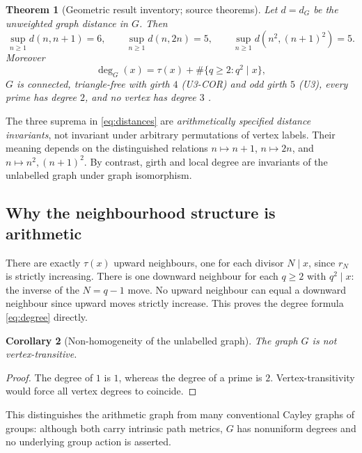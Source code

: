 \documentclass[11pt,a4paper]{article}
\newtheorem{theorem}{Theorem}[section]
\newtheorem{corollary}[theorem]{Corollary}
\theoremstyle{definition}\newtheorem{definition}[theorem]{Definition}
\begin{document}
\begin{theorem}[Geometric result inventory; source theorems]\label{thm:geom}
Let $d=d_G$ be the unweighted graph distance in $G$. Then
\begin{equation}\label{eq:distances}
\sup_{n\ge1}d(n,n+1)=6,\qquad
\sup_{n\ge1}d(n,2n)=5,\qquad
\sup_{n\ge1}d(n^2,(n+1)^2)=5.
\end{equation}
Moreover
\begin{equation}\label{eq:degree}
\deg_G(x)=\tau(x)+\#\{q\ge2:q^2\mid x\},
\end{equation}
$G$ is connected, triangle-free with girth $4$ (U3-COR) and odd girth $5$ (U3), every prime has degree $2$, and no vertex has degree $3$ \cite{geometry,u3,u3cor}.
\end{theorem}

The three suprema in \eqref{eq:distances} are \emph{arithmetically specified distance invariants}, not invariant under arbitrary permutations of vertex labels. Their meaning depends on the distinguished relations $n\mapsto n+1$, $n\mapsto 2n$, and $n\mapsto n^2,(n+1)^2$. By contrast, girth and local degree are invariants of the unlabelled graph under graph isomorphism.

\subsection{Why the neighbourhood structure is arithmetic}
There are exactly $\tau(x)$ upward neighbours, one for each divisor $N\mid x$, since $r_N$ is strictly increasing. There is one downward neighbour for each $q\ge2$ with $q^2\mid x$: the inverse of the $N=q-1$ move. No upward neighbour can equal a downward neighbour since upward moves strictly increase. This proves the degree formula \eqref{eq:degree} directly.

\begin{corollary}[Non-homogeneity of the unlabelled graph]\label{cor:nonhom}
The graph $G$ is not vertex-transitive.
\end{corollary}
\begin{proof}
The degree of $1$ is $1$, whereas the degree of a prime is $2$. Vertex-transitivity would force all vertex degrees to coincide.
\end{proof}

This distinguishes the arithmetic graph from many conventional Cayley graphs of groups: although both carry intrinsic path metrics, $G$ has nonuniform degrees and no underlying group action is asserted.
\end{document}
